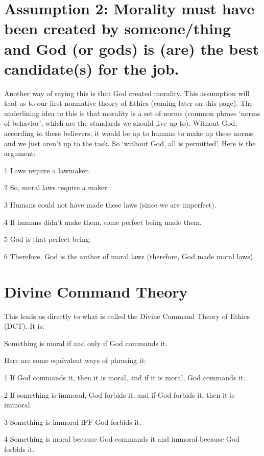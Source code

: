 \section{Assumption 2: Morality must have been created by someone/thing and God (or gods) is (are) the best candidate(s) for the job.}

Another way of saying this is that God created morality. This assumption will lead us to our first normative theory of Ethics (coming later on this page). The underlining idea to this is that morality is a set of norms (common phrase ‘norms of behavior’, which are the standards we should live up to). Without God, according to these believers, it would be up to humans to make up these norms and we just aren’t up to the task. So ‘without God, all is permitted’. Here is the argument:
\begin{earg}
    \item[1] Laws require a lawmaker.
    \item[2] So, moral laws require a maker.
    \item[3] Humans could not have made these laws (since we are imperfect).
    \item[4] If humans didn’t make them, some perfect being made them.
    \item[5] God is that perfect being.
    \item[6] Therefore, God is the author of moral laws (therefore, God made moral laws).
\end{earg}

\section{Divine Command Theory}

This leads us directly to what is called the \gls{Divine Command Theory} of Ethics (DCT). It is:
\begin{center}
Something is moral if and only if God commands it.
\end{center}
Here are some equivalent ways of phrasing it:
\begin{earg}
    \item[1] If God commands it, then it is moral, and if it is moral, God commands it.
    \item[2] If something is immoral, God forbids it, and if God forbids it, then it is immoral.
    \item[3] Something is immoral IFF God forbids it.
    \item[4] Something is moral because God commands it and immoral because God forbids it.
\end{earg}

